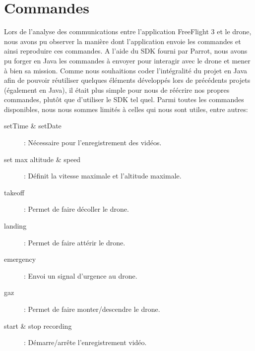 \documentclass[12pt, openany]{report}
\begin{document}
\section{Commandes}
Lors de l'analyse des communications entre l'application FreeFlight 3 et le drone, nous avons pu observer la manière dont l'application envoie les commandes et ainsi reproduire ces commandes. A l'aide du SDK fourni par Parrot, nous avons pu forger en Java les commandes à envoyer pour interagir avec le drone et mener à bien sa mission. Comme nous souhaitions coder l'intégralité du projet en Java afin de pouvoir réutiliser quelques éléments développés lors de précédents projets (également en Java), il était plus simple pour nous de réécrire nos propres commandes, plutôt que d'utiliser le SDK tel quel.
Parmi toutes les commandes disponibles, nous nous sommes limités à celles qui nous sont utiles, entre autres:
\begin{description}
\item[setTime \& setDate] : Nécessaire pour l'enregistrement des vidéos.
\item[set max altitude \& speed] : Définit la vitesse maximale et l'altitude maximale.
\item[takeoff] : Permet de faire décoller le drone.
\item[landing] : Permet de faire attérir le drone.
\item[emergency] : Envoi un signal d'urgence au drone.
\item[gaz] : Permet de faire monter/descendre le drone.
\item[start \& stop recording] : Démarre/arrête l'enregistrement vidéo.
\end{description}
\end{document}
